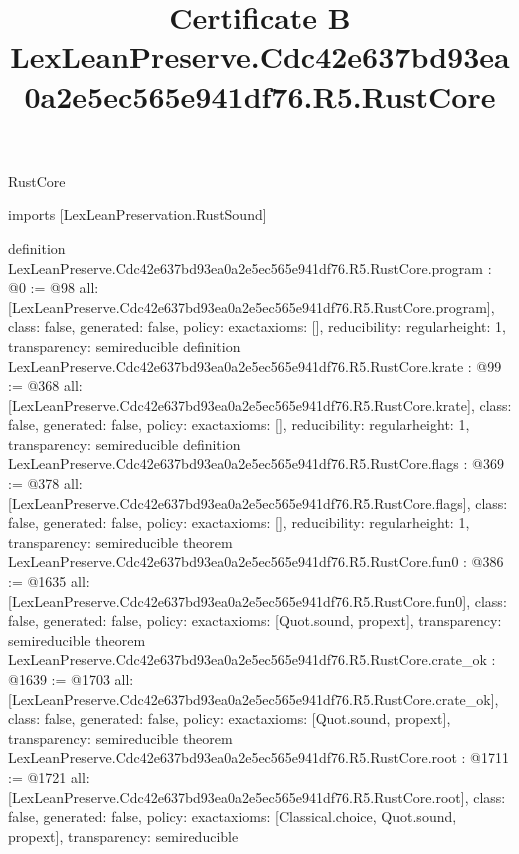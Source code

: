 \begin{lexlean}{RustCore}
\title{Certificate B LexLeanPreserve.Cdc42e637bd93ea0a2e5ec565e941df76.R5.RustCore}
\begin{coremodule}
imports [LexLeanPreservation.RustSound]

definition LexLeanPreserve.Cdc42e637bd93ea0a2e5ec565e941df76.R5.RustCore.program : @0 := @98 {
  all: [LexLeanPreserve.Cdc42e637bd93ea0a2e5ec565e941df76.R5.RustCore.program],
  class: false,
  generated: false,
  policy: exact{axioms: []},
  reducibility: regular{height: 1},
  transparency: semireducible
}
definition LexLeanPreserve.Cdc42e637bd93ea0a2e5ec565e941df76.R5.RustCore.krate : @99 := @368 {
  all: [LexLeanPreserve.Cdc42e637bd93ea0a2e5ec565e941df76.R5.RustCore.krate],
  class: false,
  generated: false,
  policy: exact{axioms: []},
  reducibility: regular{height: 1},
  transparency: semireducible
}
definition LexLeanPreserve.Cdc42e637bd93ea0a2e5ec565e941df76.R5.RustCore.flags : @369 := @378 {
  all: [LexLeanPreserve.Cdc42e637bd93ea0a2e5ec565e941df76.R5.RustCore.flags],
  class: false,
  generated: false,
  policy: exact{axioms: []},
  reducibility: regular{height: 1},
  transparency: semireducible
}
theorem LexLeanPreserve.Cdc42e637bd93ea0a2e5ec565e941df76.R5.RustCore.fun0 : @386 := @1635 {
  all: [LexLeanPreserve.Cdc42e637bd93ea0a2e5ec565e941df76.R5.RustCore.fun0],
  class: false,
  generated: false,
  policy: exact{axioms: [Quot.sound, propext]},
  transparency: semireducible
}
theorem LexLeanPreserve.Cdc42e637bd93ea0a2e5ec565e941df76.R5.RustCore.crate_ok : @1639 := @1703 {
  all: [LexLeanPreserve.Cdc42e637bd93ea0a2e5ec565e941df76.R5.RustCore.crate_ok],
  class: false,
  generated: false,
  policy: exact{axioms: [Quot.sound, propext]},
  transparency: semireducible
}
theorem LexLeanPreserve.Cdc42e637bd93ea0a2e5ec565e941df76.R5.RustCore.root : @1711 := @1721 {
  all: [LexLeanPreserve.Cdc42e637bd93ea0a2e5ec565e941df76.R5.RustCore.root],
  class: false,
  generated: false,
  policy: exact{axioms: [Classical.choice, Quot.sound, propext]},
  transparency: semireducible
}


\end{coremodule}
\end{lexlean}
